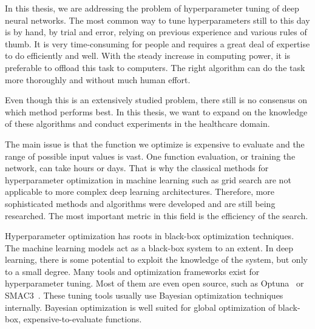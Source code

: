 


In this thesis, we are addressing the problem of hyperparameter tuning of deep neural networks. The most common way to tune hyperparameters still to this day is by hand, by trial and error, relying on previous experience and various rules of thumb. It is very time-consuming for people and requires a great deal of expertise to do efficiently and well.
With the steady increase in computing power, it is preferable to offload this task to computers. The right algorithm can do the task more thoroughly and without much human effort.

Even though this is an extensively studied problem, there still is no consensus on which method performs best. In this thesis, we want to expand on the knowledge of these algorithms and conduct experiments in the healthcare domain.

The main issue is that the function we optimize is expensive to evaluate and the range of possible input values is vast. One function evaluation, or training the network, can take hours or days. That is why the classical methods for hyperparameter optimization in machine learning such as grid search are not applicable to more complex deep learning architectures. Therefore, more sophisticated methods and algorithms were developed and are still being researched. The most important metric in this field is the efficiency of the search.

Hyperparameter optimization has roots in black-box optimization techniques. The machine learning models act as a black-box system to an extent. In deep learning, there is some potential to exploit the knowledge of the system, but only to a small degree. Many tools and optimization frameworks exist for hyperparameter tuning. Most of them are even open source, such as Optuna~\cite{akiba2019optuna} or SMAC3~\cite{smac3}. These tuning tools usually use Bayesian optimization techniques internally. Bayesian optimization is well suited for global optimization of black-box, expensive-to-evaluate functions.


